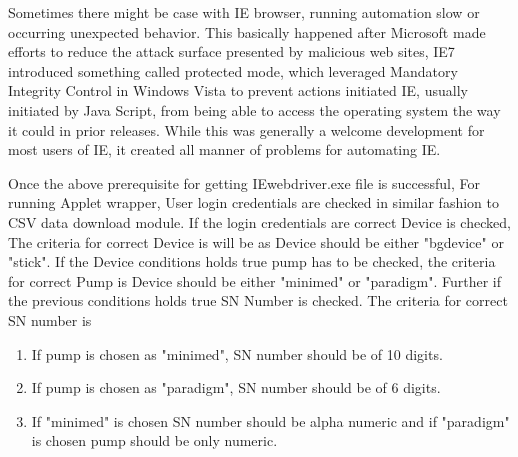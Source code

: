 \documentclass[article,type=msc,colorback,accentcolor=tud9c,twoside,11pt]{tudthesis}
\begin{document}
Sometimes there might be case with IE browser, running automation slow or occurring unexpected behavior. This basically happened after Microsoft made efforts to reduce the attack surface presented by malicious web sites, IE7 introduced something called protected mode, which leveraged Mandatory Integrity Control in Windows Vista to prevent actions initiated IE, usually initiated by Java Script, from being able to access the operating system the way it could in prior releases. While this was generally a welcome development for most users of IE, it created all manner of problems for automating IE.

Once the above prerequisite for getting IEwebdriver.exe file is successful, For running Applet wrapper, User login credentials are checked in similar fashion to CSV data download module. If the login credentials are correct Device is checked, The criteria for correct Device is will be as Device should be either "bgdevice" or "stick". If the Device conditions holds true pump has to be checked, the criteria for correct Pump is Device should be either "minimed" or "paradigm".  Further if the previous conditions holds true SN Number is checked. The criteria for correct SN number is
\begin{enumerate}
\item If pump is chosen as "minimed", SN number should  be of 10 digits.
\item  If pump is chosen as "paradigm", SN number should  be of 6 digits.
\item  If "minimed" is chosen SN number should be alpha numeric and if "paradigm" is chosen pump should be only numeric.
\end{enumerate}
\end{document}
